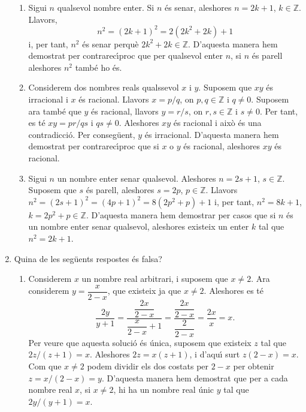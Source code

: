 \begin{enumerate}
\begin{enumerate}
\item Sigui $n$ qualsevol nombre enter. Si $n$ \'{e}s senar, aleshores
$n=2k+1$, $k\in\mathbb{Z}$. Llavors,%
\[
n^{2}=\left(  2k+1\right)  ^{2}=2\left(  2k^{2}+2k\right)  +1
\]
i, per tant, $n^{2}$ \'{e}s senar perqu\`{e} $2k^{2}+2k\in\mathbb{Z}$.
D'aquesta manera hem demostrat per contrarec\'{\i}proc que per qualsevol enter
$n$, si $n$ \'{e}s parell aleshores $n^{2}$ tamb\'{e} ho \'{e}s.

\item Considerem dos nombres reals qualssevol $x$ i $y$. Suposem que $xy$
\'{e}s irracional i $x$ \'{e}s racional. Llavors $x=p/q$, on $p,q\in
\mathbb{Z}$ i $q\neq0$. Suposem ara tamb\'{e} que $y$ \'{e}s racional, llavors
$y=r/s$, on $r,s\in\mathbb{Z}$ i $s\neq0$. Per tant, es t\'{e} $xy=pr/qs$ i
$qs\neq0$. Aleshores $xy$ \'{e}s racional i aix\`{o} \'{e}s una
contradicci\'{o}. Per conseg\"{u}ent, $y$ \'{e}s irracional. D'aquesta manera
hem demostrat per contrarec\'{\i}proc que si $x$ o $y$ \'{e}s racional,
aleshores $xy$ \'{e}s racional.

\item Sigui $n$ un nombre enter senar qualsevol. Aleshores $n=2s+1$,
$s\in\mathbb{Z}$. Suposem que $s$ \'{e}s parell, aleshores $s=2p$,
$p\in\mathbb{Z}$. Llavors $n^{2}=\left(  2s+1\right)  ^{2}=\left(
4p+1\right)  ^{2}=8\left(  2p^{2}+p\right)  +1$ i, per tant, $n^{2}=8k+1$,
$k=2p^{2}+p\in\mathbb{Z}$. D'aquesta manera hem demostrar per casos que si $n$
\'{e}s un nombre enter senar qualsevol, aleshores existeix un enter $k$ tal
que $n^{2}=2k+1$.
\end{enumerate}

\item Quina de les seg\"{u}ents respostes \'{e}s falsa?

\begin{enumerate}
\item Considerem $x$ un nombre real arbitrari, i suposem que $x\neq2$. Ara
considerem $y=\dfrac{x}{2-x}$, que existeix ja que $x\neq2$. Aleshores es
t\'{e}%
\[
\frac{2y}{y+1}=\frac{\dfrac{2x}{2-x}}{\dfrac{x}{2-x}+1}=\frac{\dfrac{2x}{2-x}%
}{\dfrac{2}{2-x}}=\frac{2x}{x}=x\text{.}%
\]
Per veure que aquesta soluci\'{o} \'{e}s \'{u}nica, suposem que existeix $z$
tal que $2z/(z+1)=x$. Aleshores $2z=x\left(  z+1\right)  $, i d'aqu\'{\i} surt
$z\left(  2-x\right)  =x$. Com que $x\neq2$ podem dividir els dos costats per
$2-x$ per obtenir $z=x/\left(  2-x\right)  =y$. D'aquesta manera hem demostrat
que per a cada nombre real $x$, si $x\neq2$, hi ha un nombre real \'{u}nic $y$
tal que $2y/\left(  y+1\right)  =x$.


\end{enumerate}
\end{enumerate}

